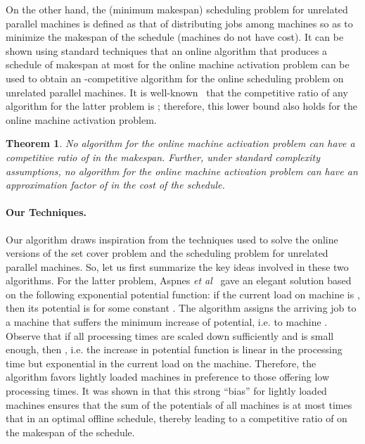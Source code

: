 \documentclass[11pt]{article}
\newtheorem{theorem}{Theorem}
\begin{document}
On the other hand, the (minimum makespan) scheduling problem 
for unrelated parallel machines is 
defined as that of distributing  jobs among  machines so as to minimize the 
makespan of the schedule (machines do not have cost). It can be shown using standard 
techniques that an online algorithm that produces a schedule of makespan at most 
 for the online machine activation 
problem can be used to obtain an -competitive algorithm for the online
scheduling problem on unrelated parallel machines. 
It is well-known~\cite{AzarNR95} that the competitive ratio of any algorithm 
for the latter problem is ; therefore, this
lower bound also holds for the online machine activation problem. 
\begin{theorem}
\label{thm:lowerbound}
No algorithm for the online machine activation problem can have a competitive
ratio of  in the makespan. Further, under standard complexity 
assumptions, no algorithm for the online machine activation problem can have 
an approximation factor of  in the cost of the schedule.
\end{theorem}
\noindent
\paragraph{Our Techniques.}
Our algorithm draws inspiration from the techniques used to solve the online 
versions of the set cover problem and the scheduling problem for unrelated 
parallel machines. So, let us first summarize the key ideas involved in these
two algorithms. For the latter problem, Aspnes {\em et al}~\cite{AspnesAFPW97} 
gave an elegant solution based on the following exponential potential function: 
if the current load on machine  is
, then its potential is   for some constant . 
The algorithm assigns the arriving job to a machine that suffers the minimum
increase of potential, i.e. to machine 
. Observe that if all
processing times are scaled down sufficiently and  is small enough, then
, i.e. the 
increase in potential function is linear in the processing time but exponential
in the current load on the machine. Therefore, the algorithm favors 
lightly loaded machines in preference to those offering low processing times.
It was shown in \cite{AspnesAFPW97} that this strong ``bias'' for lightly loaded 
machines ensures that the sum of the potentials of all machines is at most 
 times that in an optimal offline schedule, thereby leading to a competitive 
ratio of  on the makespan of the schedule. 
\end{document}
